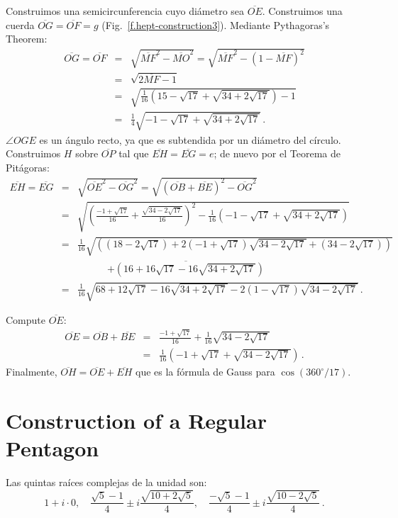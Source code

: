 Construimos una semicircunferencia cuyo diámetro sea $\overline{OE}$. Construimos una cuerda $\overline{OG}=\overline{OF}=g$ (Fig.~\ref{f.hept-construction3}). Mediante Pythagoras's Theorem:
\begin{eqnarray*}
\overline{OG}=\overline{OF}&=&\sqrt{\overline{MF}^2-\overline{MO}^2}=\sqrt{\overline{MF}^2-(1-\overline{MF})^2}\\
&=&\sqrt{2\overline{MF}-1}\\
&=&\sqrt{\frac{1}{16}\left(15-\sqrt{17}+\sqrt{34+2\sqrt{17}}\right)-1}\\
&=&\frac{1}{4}\sqrt{-1-\sqrt{17}+\sqrt{34+2\sqrt{17}}}\,.
\end{eqnarray*}
$\angle OGE$ es un ángulo recto, ya que es subtendida por un diámetro del círculo. Construimos $H$ sobre $\overline{OP}$ tal que $\overline{EH}=\overline{EG}=e$; de nuevo por el Teorema de Pitágoras:
\begin{eqnarray*}
\overline{EH}=\overline{EG}&=&\sqrt{\overline{OE}^2-\overline{OG}^2}=\sqrt{(\overline{OB}+\overline{BE})^2-\overline{OG}^2}\\
&=&\sqrt{\left(\frac{-1+\sqrt{17}}{16}+\frac{\sqrt{34-2\sqrt{17}}}{16}\right)^2-
\frac{1}{16}\left(-1-\sqrt{17}+\sqrt{34+2\sqrt{17}}\right)}
\\
&=&\frac{1}{16}\sqrt{\left(
(18-2\sqrt{17})+ 2(-1+\sqrt{17})\sqrt{34-2\sqrt{17}}+
(34-2\sqrt{17})\right)}\\
&&\quad\quad\quad\overline{
+\left(16+16\sqrt{17}-16\sqrt{34+2\sqrt{17}}\right)}\\
&=&\frac{1}{16}\sqrt{
68+12\sqrt{17}-16\sqrt{34+2\sqrt{17}}-2(1-\sqrt{17})\sqrt{34-2\sqrt{17}}
}\,.
\end{eqnarray*}

Compute $\overline{OE}$:
\begin{eqnarray*}
\overline{OE}=\overline{OB}+\overline{BE}&=&\frac{-1+\sqrt{17}}{16}+\frac{1}{16}\sqrt{34-2\sqrt{17}}\\
&=&\frac{1}{16}\left(-1+\sqrt{17}+\sqrt{34-2\sqrt{17}}\right)\,.
\end{eqnarray*}
Finalmente, $\overline{OH}=\overline{OE}+\overline{EH}$ que es la fórmula de Gauss para $\cos (360^\circ/17)$.

\section{Construction of a Regular Pentagon}\label{s.hept-pentagon}

\begin{advanced}
Las quintas raíces complejas de la unidad son:
\[
1+i\cdot 0,\quad\frac{\sqrt{5}-1}{4}\pm i \frac{\sqrt{10+2\sqrt{5}}}{4},\quad\frac{-\sqrt{5}-1}{4}\pm i \frac{\sqrt{10-2\sqrt{5}}}{4}\,.
\]
\end{advanced}

